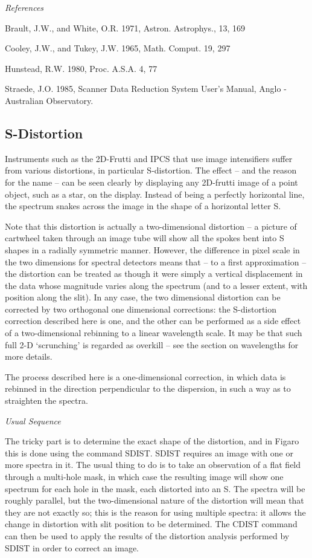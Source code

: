 \goodbreak
\vspace{12pt}
{\it References}

Brault, J.W., and White, O.R. 1971, Astron. Astrophys., 13, 169

Cooley, J.W., and Tukey, J.W. 1965, Math. Comput. 19, 297

Hunstead, R.W. 1980, Proc. A.S.A. 4, 77

Straede, J.O. 1985, Scanner Data Reduction System User's Manual, 
Anglo - Australian Observatory.


\subsection{S-Distortion}

Instruments such as the 2D-Frutti and IPCS that use image intensifiers
suffer from various distortions, in particular S-distortion.  The effect --
and the reason for the name -- can be seen clearly by displaying any 2D-frutti
image of a point object, such as a star, on the display. Instead of being
a perfectly horizontal line, the spectrum snakes across the image in the shape
of a horizontal letter S.  

Note that this distortion is actually a two-dim\-en\-sional distortion --
a picture of cartwheel taken through an image tube will show all the spokes
bent into S shapes in a radially symmetric manner.  However, the difference in
pixel scale in the two dimensions for spectral detectors means that -- to a
first approximation -- the distortion can be treated as though it were simply
a vertical displacement in the data whose magnitude varies along the spectrum
(and to a lesser extent, with position along the slit).
In any case, the two dimensional distortion can be corrected by two orthogonal
one dimensional corrections: the S-distortion correction described here is one,
and the other can be 
performed as a side effect of a two-dimensional rebinning to
a linear wavelength scale.  It may be that such full 2-D `scrunching' is 
regarded as overkill -- see the section on wavelengths for more details.

The process described here is a one-dimensional correction, in which
data is rebinned in the direction perpendicular to the dispersion, in such
a way as to straighten the spectra.


\goodbreak
\vspace{12pt}
{\it Usual Sequence}

The tricky part is to determine the exact shape of the distortion, and
in Figaro this is done using the command SDIST.  SDIST requires an image with
one or more spectra in it.  The usual thing to do is to take an observation
of a flat field through a multi-hole mask, in which case the resulting image
will show one spectrum for each hole in the mask, each distorted into an S.
The spectra will be roughly parallel, but the two-dimensional nature of the
distortion will mean that they are not exactly so; this is the reason for
using multiple spectra: it allows the change in distortion with slit
position to be determined.  The CDIST command can then be used to apply the
results of the distortion analysis performed by SDIST in order to correct
an image.

